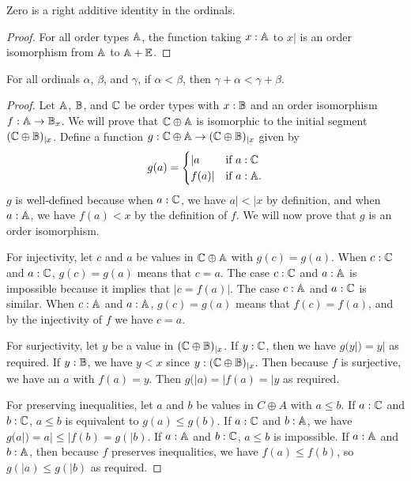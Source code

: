 \documentclass[../../math.tex]{subfiles}
\begin{document}
\begin{instance}
    Zero is a right additive identity in the ordinals.
\end{instance}
\begin{proof}
    For all order types $\mathbb{A}$, the function taking $x : \mathbb{A}$ to $x|$ is an order
    isomorphism from $\mathbb{A}$ to $\mathbb{A} + \mathbb{E}$.
\end{proof}

\begin{theorem} \label{ord_lt_lplus}
    For all ordinals $\alpha$, $\beta$, and $\gamma$, if $\alpha < \beta$, then
    $\gamma + \alpha < \gamma + \beta$.
\end{theorem}
\begin{proof}
    Let $\mathbb{A}$, $\mathbb{B}$, and $\mathbb{C}$ be order types with $x : \mathbb{B}$ and an order
    isomorphism $f : \mathbb{A} \to \mathbb{B}_x$.  We will prove that $\mathbb{C} \oplus \mathbb{A}$ is
    isomorphic to the initial segment $(\mathbb{C} \oplus \mathbb{B})_{|x}$.  Define a function
    $g : \mathbb{C} \oplus \mathbb{A} \to (\mathbb{C} \oplus \mathbb{B})_{|x}$ given by
    \[
        g(a) =
        \begin{cases}
            |a    &\text{if $a : \mathbb{C}$} \\
            f(a)| &\text{if $a : \mathbb{A}$.}
        \end{cases}
    \]
    $g$ is well-defined because when $a : \mathbb{C}$, we have $a| < |x$ by
    definition, and when $a : \mathbb{A}$, we have $f(a) < x$ by the definition of
    $f$.  We will now prove that $g$ is an order isomorphism.

    For injectivity, let $c$ and $a$ be values in $\mathbb{C} \oplus \mathbb{A}$ with $g(c) =
    g(a)$.  When $c : \mathbb{C}$ and $a : \mathbb{C}$, $g(c) = g(a)$ means that $c = a$.  The
    case $c : \mathbb{C}$ and $a : \mathbb{A}$ is impossible because it implies that $|c =
    f(a)|$.  The case $c : \mathbb{A}$ and $a : \mathbb{C}$ is similar.  When $c : \mathbb{A}$ and $a :
    \mathbb{A}$, $g(c) = g(a)$ means that $f(c) = f(a)$, and by the injectivity of $f$
    we have $c = a$.

    For surjectivity, let $y$ be a value in $(\mathbb{C} \oplus \mathbb{B})_{|x}$.  If $y : \mathbb{C}$,
    then we have $g(y|) = y|$ as required.  If $y : \mathbb{B}$, we have $y < x$ since
    $y : (\mathbb{C} \oplus \mathbb{B})_{|x}$.  Then because $f$ is surjective, we have an $a$
    with $f(a) = y$.  Then $g(|a) = |f(a) = |y$ as required.

    For preserving inequalities, let $a$ and $b$ be values in $C \oplus A$ with
    $a \leq b$.  If $a : \mathbb{C}$ and $b : \mathbb{C}$, $a \leq b$ is equivalent to $g(a)
    \leq g(b)$.  If $a : \mathbb{C}$ and $b : \mathbb{A}$, we have $g(a|) = a| \leq |f(b) =
    g(|b)$.  If $a : \mathbb{A}$ and $b : \mathbb{C}$, $a \leq b$ is impossible.  If $a : \mathbb{A}$
    and $b : \mathbb{A}$, then because $f$ preserves inequalities, we have $f(a) \leq
    f(b)$, so $g(|a) \leq g(|b)$ as required.
\end{proof}
\end{document}
